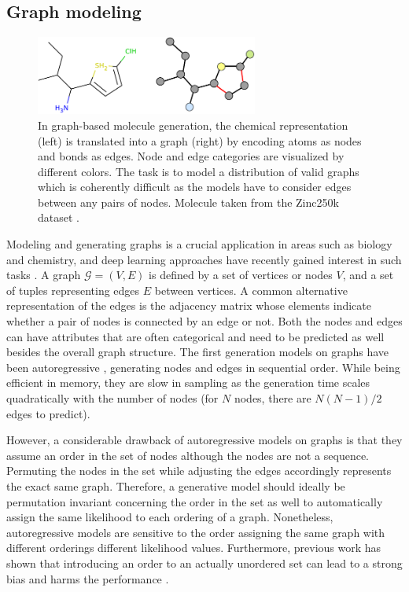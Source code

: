\subsection{Graph modeling}
\label{sec:related_work_graph_modeling}

\begin{figure}[b!]
    \centering
    \includegraphics[width=0.65\textwidth]{figures/related_work_figures/molecule_graph.pdf}
    \caption[Visualization of molecule graph]{In graph-based molecule generation, the chemical representation (left) is translated into a graph (right) by encoding atoms as nodes and bonds as edges. Node and edge categories are visualized by different colors. The task is to model a distribution of valid graphs which is coherently difficult as the models have to consider edges between any pairs of nodes. Molecule taken from the Zinc250k dataset \cite{Zinc250k}.}
    \label{fig:related_work_graph_molecule}
\end{figure}

Modeling and generating graphs is a crucial application in areas such as biology and chemistry, and deep learning approaches have recently gained interest in such tasks \cite{GraphRNN, GraphOverview1, GraphOverview2, GraphAF}.
A graph $\mathcal{G}=(V,E)$ is defined by a set of vertices or nodes $V$, and a set of tuples representing edges $E$ between vertices. 
A common alternative representation of the edges is the adjacency matrix whose elements indicate whether a pair of nodes is connected by an edge or not.
Both the nodes and edges can have attributes that are often categorical and need to be predicted as well besides the overall graph structure.
The first generation models on graphs have been autoregressive \cite{GraphRNNAttention, GraphRNN, MolecularRNN}, generating nodes and edges in sequential order. 
While being efficient in memory, they are slow in sampling as the generation time scales quadratically with the number of nodes (for $N$ nodes, there are $N(N-1)/2$ edges to predict).

However, a considerable drawback of autoregressive models on graphs is that they assume an order in the set of nodes although the nodes are not a sequence. 
Permuting the nodes in the set while adjusting the edges accordingly represents the exact same graph.
Therefore, a generative model should ideally be permutation invariant concerning the order in the set as well to automatically assign the same likelihood to each ordering of a graph. 
Nonetheless, autoregressive models are sensitive to the order assigning the same graph with different orderings different likelihood values.
Furthermore, previous work has shown that introducing an order to an actually unordered set can lead to a strong bias and harms the performance \cite{OrderMatters}.

